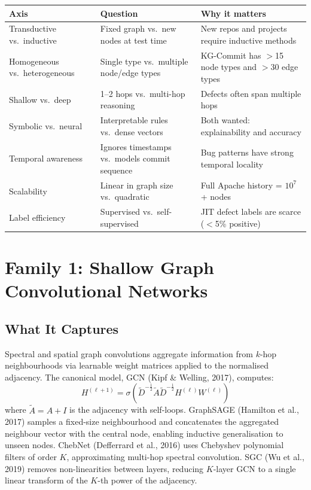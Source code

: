 \documentclass[12pt,a4paper]{article}
\begin{document}
\begin{longtable}{p{3.2cm}p{5cm}p{4.5cm}}
\toprule
\textbf{Axis} & \textbf{Question} & \textbf{Why it matters} \\
\midrule
\endhead
Transductive vs.\ inductive & Fixed graph vs.\ new nodes at test time & New repos and projects require inductive methods \\
Homogeneous vs.\ heterogeneous & Single type vs.\ multiple node/edge types & KG-Commit has $>$15 node types and $>$30 edge types \\
Shallow vs.\ deep & 1--2 hops vs.\ multi-hop reasoning & Defects often span multiple hops \\
Symbolic vs.\ neural & Interpretable rules vs.\ dense vectors & Both wanted: explainability and accuracy \\
Temporal awareness & Ignores timestamps vs.\ models commit sequence & Bug patterns have strong temporal locality \\
Scalability & Linear in graph size vs.\ quadratic & Full Apache history = $10^7$+ nodes \\
Label efficiency & Supervised vs.\ self-supervised & JIT defect labels are scarce ($<$5\% positive) \\
\bottomrule
\end{longtable}

\section{Family 1: Shallow Graph Convolutional Networks}

\subsection{What It Captures}

Spectral and spatial graph convolutions aggregate information from $k$-hop
neighbourhoods via learnable weight matrices applied to the normalised adjacency.
The canonical model, GCN (Kipf \& Welling, 2017), computes:
\[
  H^{(\ell+1)} = \sigma\!\left(\tilde{D}^{-\frac{1}{2}}\tilde{A}\tilde{D}^{-\frac{1}{2}}H^{(\ell)}W^{(\ell)}\right)
\]
where $\tilde{A} = A + I$ is the adjacency with self-loops. GraphSAGE (Hamilton
et al., 2017) samples a fixed-size neighbourhood and concatenates the aggregated
neighbour vector with the central node, enabling inductive generalisation to
unseen nodes. ChebNet (Defferrard et al., 2016) uses Chebyshev polynomial filters
of order $K$, approximating multi-hop spectral convolution. SGC (Wu et al., 2019)
removes non-linearities between layers, reducing $K$-layer GCN to a single linear
transform of the $K$-th power of the adjacency.
\end{document}
